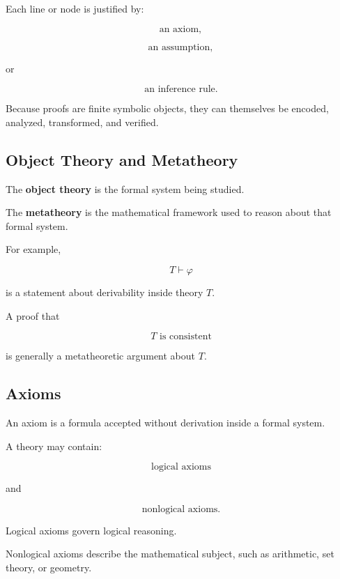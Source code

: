 Each line or node is justified by:

\[
\boxed{
\text{an axiom},
}
\]

\[
\boxed{
\text{an assumption},
}
\]

or

\[
\boxed{
\text{an inference rule}.
}
\]

Because proofs are finite symbolic objects, they can themselves be encoded,
analyzed, transformed, and verified.

\subsection{Object Theory and Metatheory}
\label{subsec:proof-theory-object-metatheory}

The \textbf{object theory} is the formal system being studied.

The \textbf{metatheory} is the mathematical framework used to reason about
that formal system.

For example,

\[
T\vdash\varphi
\]

is a statement about derivability inside theory \(T\).

A proof that

\[
T
\text{ is consistent}
\]

is generally a metatheoretic argument about \(T\).

\subsection{Axioms}
\label{subsec:proof-theoretic-axioms}

An axiom is a formula accepted without derivation inside a formal system.

A theory may contain:

\[
\boxed{
\text{logical axioms}
}
\]

and

\[
\boxed{
\text{nonlogical axioms}.
}
\]

Logical axioms govern logical reasoning.

Nonlogical axioms describe the mathematical subject, such as arithmetic,
set theory, or geometry.

